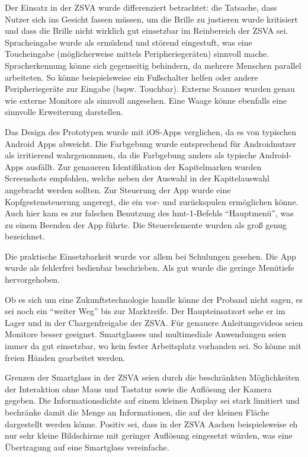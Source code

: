Der Einsatz in der ZSVA wurde differenziert betrachtet: die Tatsache, dass Nutzer sich ins Gesicht fassen müssen, um die Brille zu justieren wurde kritisiert und dass die Brille nicht wirklich gut einsetzbar im Reinbereich der ZSVA sei. Spracheingabe wurde als ermüdend und störend eingestuft, was eine Toucheingabe (möglicherweise mittels Peripheriegeräten) sinnvoll mache. Spracherkennung könne sich gegenseitig behindern, da mehrere Menschen parallel arbeiteten. So könne beispielsweise ein Fußschalter helfen oder andere Peripheriegeräte zur Eingabe (bspw. Touchbar). Externe Scanner wurden genau wie externe Monitore als sinnvoll angesehen. Eine Waage könne ebenfalls eine sinnvolle Erweiterung darstellen.

Das Design des Prototypen wurde mit iOS-Apps verglichen, da es von typischen Android Apps abweicht. Die Farbgebung wurde entsprechend für Androidnutzer als irritierend wahrgenommen, da die Farbgebung anders als typische Android-Apps ausfällt. Zur genaueren Identifikation der Kapitelmarken wurden Screenshots empfohlen, welche neben der Auswahl in der Kapitelauswahl angebracht werden sollten. Zur Steuerung der App wurde eine Kopfgestensteuerung angeregt, die ein vor- und zurückspulen ermöglichen könne. Auch hier kam es zur falschen Benutzung des hmt-1-Befehls \enquote{Hauptmenü}, was zu einem Beenden der App führte. Die Steuerelemente wurden als groß genug bezeichnet.

Die praktische Einsetzbarkeit wurde vor allem bei Schulungen gesehen. Die App wurde als fehlerfrei bedienbar beschrieben. Als gut wurde die geringe Menütiefe hervorgehoben.

Ob es sich um eine Zukunftstechnologie handle könne der Proband nicht sagen, es sei noch ein \enquote{weiter Weg} bis zur Marktreife. Der Haupteinsatzort sehe er im Lager und in der Chargenfreigabe der ZSVA. Für genauere Anleitungsvideos seien Monitore besser geeignet. Smartglasses und multimediale Anwendungen seien immer da gut einsetzbar, wo kein fester Arbeitsplatz vorhanden sei. So könne mit freien Händen gearbeitet werden.

Grenzen der Smartglass in der ZSVA seien durch die beschränkten Möglichkeiten der Interaktion ohne Maus und Tastatur sowie die Auflösung der Kamera gegeben. Die Informationsdichte auf einem kleinen Display sei stark limitiert und bechränke damit die Menge an Informationen, die auf der kleinen Fläche dargestellt werden könne. Positiv sei, dass in der ZSVA Aachen beispielsweise eh nur sehr kleine Bildschirme mit geringer Auflösung eingesetzt würden, was eine Übertragung auf eine Smartglass vereinfache.

